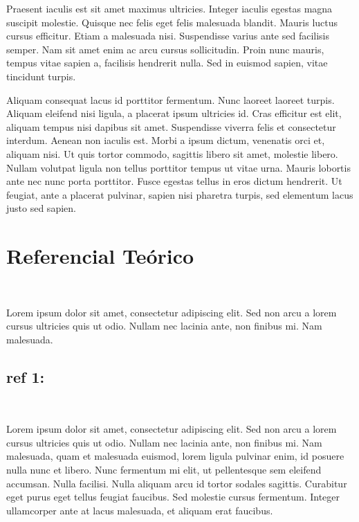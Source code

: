 \documentclass[11pt, a4paper]{article} %
\begin{document}
Praesent iaculis est sit amet maximus ultricies. Integer iaculis egestas magna suscipit molestie. Quisque nec felis eget felis malesuada blandit. Mauris luctus cursus efficitur. Etiam a malesuada nisi. Suspendisse varius ante sed facilisis semper. Nam sit amet enim ac arcu cursus sollicitudin. Proin nunc mauris, tempus vitae sapien a, facilisis hendrerit nulla. Sed in euismod sapien, vitae tincidunt turpis.

Aliquam consequat lacus id porttitor fermentum. Nunc laoreet laoreet turpis. Aliquam eleifend nisi ligula, a placerat ipsum ultricies id. Cras efficitur est elit, aliquam tempus nisi dapibus sit amet. Suspendisse viverra felis et consectetur interdum. Aenean non iaculis est. Morbi a ipsum dictum, venenatis orci et, aliquam nisi. Ut quis tortor commodo, sagittis libero sit amet, molestie libero. Nullam volutpat ligula non tellus porttitor tempus ut vitae urna. Mauris lobortis ante nec nunc porta porttitor. Fusce egestas tellus in eros dictum hendrerit. Ut feugiat, ante a placerat pulvinar, sapien nisi pharetra turpis, sed elementum lacus justo sed sapien. 
\par


\newpage

\section{Referencial Teórico} %
\textcolor{white}{.}\par
Lorem ipsum dolor sit amet, consectetur adipiscing elit. Sed non arcu a lorem cursus ultricies quis ut odio. Nullam nec lacinia ante, non finibus mi. Nam malesuada.


\subsection{ref 1:} %
\par
\textcolor{white}{.}\par
 \par Lorem ipsum dolor sit amet, consectetur adipiscing elit. Sed non arcu a lorem cursus ultricies quis ut odio. Nullam nec lacinia ante, non finibus mi. Nam malesuada, quam et malesuada euismod, lorem ligula pulvinar enim, id posuere nulla nunc et libero. Nunc fermentum mi elit, ut pellentesque sem eleifend accumsan. Nulla facilisi. Nulla aliquam arcu id tortor sodales sagittis. Curabitur eget purus eget tellus feugiat faucibus. Sed molestie cursus fermentum. Integer ullamcorper ante at lacus malesuada, et aliquam erat faucibus.
\end{document}
